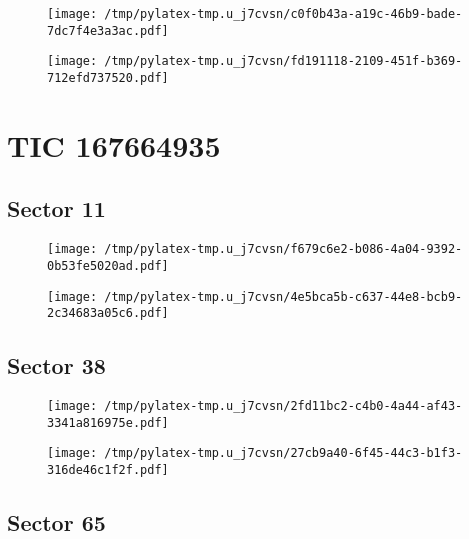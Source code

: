 \documentclass{report}%
\begin{document}
\begin{figure}[H]%
\centering%
\centering%
\texttt{[image: /tmp/pylatex-tmp.u\_j7cvsn/c0f0b43a-a19c-46b9-bade-7dc7f4e3a3ac.pdf]}%
\end{figure}

%


\begin{figure}[H]%
\centering%
\texttt{[image: /tmp/pylatex-tmp.u\_j7cvsn/fd191118-2109-451f-b369-712efd737520.pdf]}%
\end{figure}

%
\section{TIC 167664935}%
\label{sec:TIC167664935}%
\subsection{Sector 11}%
\label{subsec:16766493511}%


\begin{figure}[H]%
\centering%
\centering%
\texttt{[image: /tmp/pylatex-tmp.u\_j7cvsn/f679c6e2-b086-4a04-9392-0b53fe5020ad.pdf]}%
\end{figure}

%


\begin{figure}[H]%
\centering%
\texttt{[image: /tmp/pylatex-tmp.u\_j7cvsn/4e5bca5b-c637-44e8-bcb9-2c34683a05c6.pdf]}%
\end{figure}

%
\subsection{Sector 38}%
\label{subsec:16766493538}%


\begin{figure}[H]%
\centering%
\centering%
\texttt{[image: /tmp/pylatex-tmp.u\_j7cvsn/2fd11bc2-c4b0-4a44-af43-3341a816975e.pdf]}%
\end{figure}

%


\begin{figure}[H]%
\centering%
\texttt{[image: /tmp/pylatex-tmp.u\_j7cvsn/27cb9a40-6f45-44c3-b1f3-316de46c1f2f.pdf]}%
\end{figure}

%
\subsection{Sector 65}%
\label{subsec:16766493565}%
\end{document}
